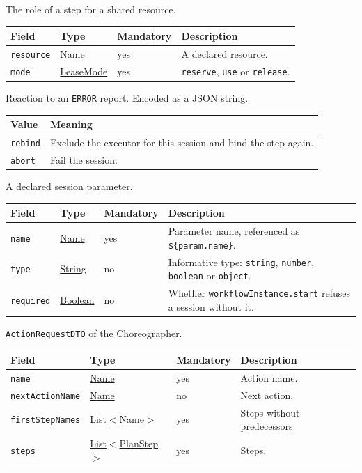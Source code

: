 \documentclass[a4paper]{arrowhead}
\newcommand{\mref}[1]{{\textcolor{ArrowheadPurple}{\hyperref[sec:model:#1]{#1}}}}
\newcommand{\pref}[1]{{\textcolor{ArrowheadGrey}{\hyperref[sec:model:primitives:#1]{#1}}}}
\begin{document}
The role of a step for a shared resource.

{\small
\begin{longtable}{|p{3.7cm}|p{4.2cm}|p{1.6cm}|p{6.3cm}|}

\hline
\rowcolor{gray!33} Field & Type & Mandatory & Description \\ \hline
\endhead
\texttt{resource} & \pref{Name} & yes & A declared resource. \\ \hline
\texttt{mode} & \mref{LeaseMode} & yes & \texttt{reserve}, \texttt{use} or \texttt{release}. \\ \hline
\end{longtable}
}

Reaction to an \texttt{ERROR} report.
 Encoded as a JSON string.
{\small
\begin{longtable}{|p{3.9cm}|p{11.9cm}|}

\hline
\rowcolor{gray!33} Value & Meaning \\ \hline
\endhead
\texttt{rebind} & Exclude the executor for this session and bind the step again. \\ \hline
\texttt{abort} & Fail the session. \\ \hline
\end{longtable}
}

A declared session parameter.

{\small
\begin{longtable}{|p{3.7cm}|p{4.2cm}|p{1.6cm}|p{6.3cm}|}

\hline
\rowcolor{gray!33} Field & Type & Mandatory & Description \\ \hline
\endhead
\texttt{name} & \pref{Name} & yes & Parameter name, referenced as \texttt{\$\{param.name\}}. \\ \hline
\texttt{type} & \pref{String} & no & Informative type: \texttt{string}, \texttt{number}, \texttt{boolean} or \texttt{object}. \\ \hline
\texttt{required} & \pref{Boolean} & no & Whether \texttt{workflowInstance.start} refuses a session without it. \\ \hline
\end{longtable}
}

\texttt{ActionRequestDTO} of the Choreographer.

{\small
\begin{longtable}{|p{3.7cm}|p{4.2cm}|p{1.6cm}|p{6.3cm}|}

\hline
\rowcolor{gray!33} Field & Type & Mandatory & Description \\ \hline
\endhead
\texttt{name} & \pref{Name} & yes & Action name. \\ \hline
\texttt{nextActionName} & \pref{Name} & no & Next action. \\ \hline
\texttt{firstStepNames} & \pref{List}$<$\pref{Name}$>$ & yes & Steps without predecessors. \\ \hline
\texttt{steps} & \pref{List}$<$\mref{PlanStep}$>$ & yes & Steps. \\ \hline
\end{longtable}
}
\end{document}

